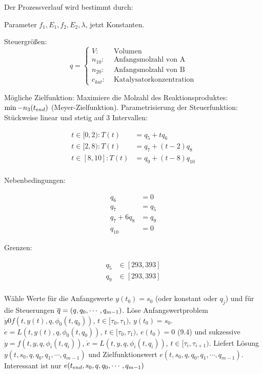 Der Prozessverlauf wird bestimmt durch:

\bitm
\item Parameter $f_1, E_1, f_2, E_2, \lambda$, jetzt Konstanten.
\item Steuergrößen: \[ q = \begin{cases} V: & \text{ Volumen} \\
n_{10}: & \text{ Anfangsmolzahl von A} \\
n_{20}: & \text{ Anfangsmolzahl von B} \\
c_{kat}: & \text{ Katalysatorkonzentration} \end{cases} \]
\eitm

Mögliche Zielfunktion: Maximiere die Molzahl des Reaktionsproduktes: $\min -n_3({t_{end}})$ (Meyer-Zielfunktion). Parametrisierung der Steuerfunktion: Stückweise linear und stetig auf 3 Intervallen:

\begin{align*}
t \in [0,2): T(t) &= q_5 + t q_6 \\
t \in [2,8): T(t) &= q_7 + (t-2) q_8 \\
t \in [8,10]: T(t) &= q_9 + (t-8)q_{10} \\
\end{align*}

Nebenbedingungen:

\begin{align*}
q_6 &= 0 \\
q_7 &= q_5 \\
q_7 + 6 q_8 &= q_9 \\
q_{10} &= 0
\end{align*}

Grenzen:

\begin{align*}
q_5 &\in [293, 393] \\
q_9 &\in [293, 393] \\
\end{align*}


Wähle Werte für die Anfangswerte $y(t_0) = s_0$ (oder konstant oder $q_j$) und für die Steuerungen $\overline q = (q,q_0,\cdots,q_{m-1})$. Löse Anfangswertproblem $\dot y 0 f(t,y(t),q,\phi_0(t,q_0))$, $t\in[\tau_0,\tau_1)$, $y(t_0) = s_0$. $\dot e = L(t,y(t),q,\phi_0(t,q_0))$, $t \in [\tau_0, \tau_1)$, $e(t_0) = 0$ (9.4) und sukzessive $\dot y = f(t,y,q,\phi_i(t,q_i))$, $\dot e = L(t,y,q,\phi_i(t,q_i))$, $t\in[\tau_i, \tau_{i+1})$. Liefert Lösung $y(t,s_0,q,q_0,q_1,\cdots,q_{m-1})$ und Zielfunktionswert $e(t,s_0,q,q_0,q_1,\cdots,q_{m-1})$. Interessant ist nur $e({t_{end}},s_0,q,q_0,\cdots,q_{m-1})$

